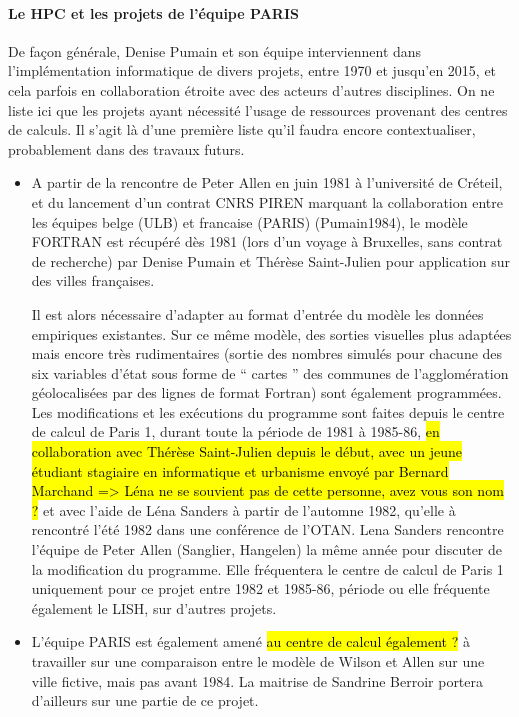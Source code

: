 \paragraph{Le HPC et les projets de l'équipe PARIS}

De façon générale, Denise Pumain et son équipe interviennent dans l’implémentation informatique de divers projets, entre 1970 et jusqu’en 2015, et cela parfois en collaboration étroite avec des acteurs d’autres disciplines. On ne liste ici que les projets ayant nécessité l'usage de ressources provenant des centres de calculs. Il s'agit là d'une première liste qu'il faudra encore contextualiser, probablement dans des travaux futurs.

\begin{itemize}[label=\textbullet]

\item A partir de la rencontre  de Peter Allen en juin 1981 à l’université de Créteil, et du lancement d’un contrat CNRS PIREN marquant la collaboration entre les équipes belge (ULB) et francaise (PARIS) (Pumain1984), le modèle FORTRAN est récupéré dès 1981 (lors d’un voyage à Bruxelles, sans contrat de recherche) par Denise Pumain et Thérèse Saint-Julien pour application sur des villes françaises.

Il est alors nécessaire d’adapter au format d’entrée du modèle les données empiriques existantes. Sur ce même modèle, des sorties visuelles plus adaptées mais encore très rudimentaires (sortie des nombres simulés pour chacune des six variables d’état sous forme de \enquote{ cartes } des communes de l’agglomération géolocalisées par des lignes de format Fortran) sont également programmées. Les modifications et les exécutions du programme sont faites depuis le centre de calcul de Paris 1, durant toute la période de 1981 à 1985-86, \hl{en collaboration avec Thérèse Saint-Julien depuis le début, avec un jeune étudiant stagiaire en informatique et urbanisme envoyé par Bernard Marchand => Léna ne se souvient pas de cette personne, avez vous son nom ?} et avec l’aide de Léna Sanders à partir de l’automne 1982, qu'elle à rencontré l'été 1982 dans une conférence de l'OTAN. Lena Sanders rencontre l'équipe de Peter Allen (Sanglier, Hangelen) la même année pour discuter de la modification du programme. Elle fréquentera le centre de calcul de Paris 1 uniquement pour ce projet entre 1982 et 1985-86, période ou elle fréquente également le LISH, sur d'autres projets.

\item L'équipe PARIS est également amené \hl{au centre de calcul également ?} à travailler sur une comparaison entre le modèle de Wilson et Allen sur une ville fictive, mais pas avant 1984. La maitrise de Sandrine Berroir portera d'ailleurs sur une partie de ce projet.


\end{itemize}
